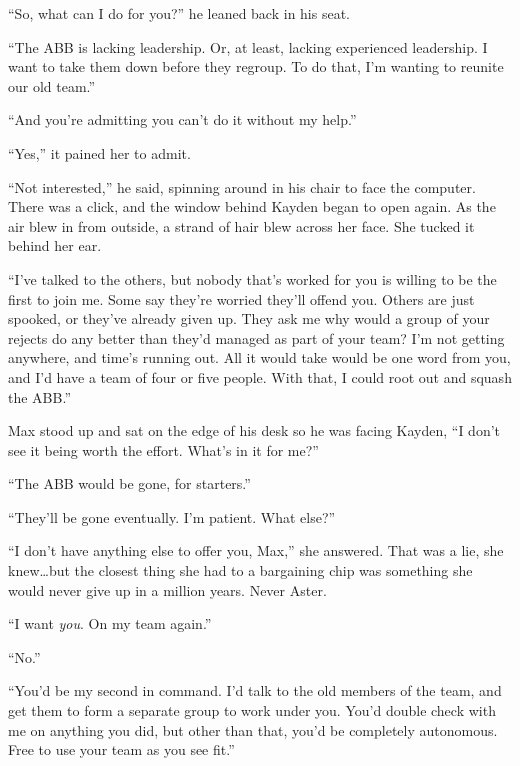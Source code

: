 ``So, what can I do for you?'' he leaned back in his seat.



``The ABB is lacking leadership.  Or, at least, lacking experienced leadership.  I want to take them down before they regroup.  To do that, I'm wanting to reunite our old team.''



``And you're admitting you can't do it without my help.''



``Yes,'' it pained her to admit.



``Not interested,'' he said, spinning around in his chair to face the computer.  There was a click, and the window behind Kayden began to open again.  As the air blew in from outside, a strand of hair blew across her face.  She tucked it behind her ear.



``I've talked to the others, but nobody that's worked for you is willing to be the first to join me.  Some say they're worried they'll offend you.  Others are just spooked, or they've already given up.  They ask me why would a group of your rejects do any better than they'd managed as part of your team?  I'm not getting anywhere, and time's running out.  All it would take would be one word from you, and I'd have a team of four or five people.  With that, I could root out and squash the ABB.''



Max stood up and sat on the edge of his desk so he was facing Kayden, ``I don't see it being worth the effort.  What's in it for me?''



``The ABB would be gone, for starters.''



``They'll be gone eventually.  I'm patient.  What else?''



``I don't have anything else to offer you, Max,'' she answered.  That was a lie, she knew\ldots but the closest thing she had to a bargaining chip was something she would never give up in a million years.  Never Aster.



``I want \emph{you}.  On my team again.''



``No.''



``You'd be my second in command.  I'd talk to the old members of the team, and get them to form a separate group to work under you.  You'd double check with me on anything you did, but other than that, you'd be completely autonomous.  Free to use your team as you see fit.''



